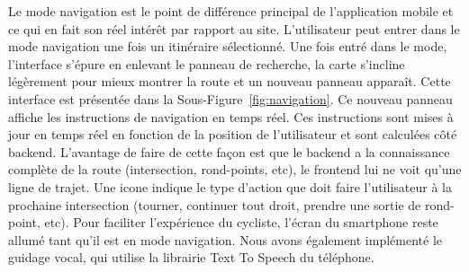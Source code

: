 \noindent Le mode navigation est le point de différence principal de l'application mobile et ce qui en fait son réel intérêt par rapport au site. L'utilisateur peut entrer dans le mode navigation une fois un itinéraire sélectionné. Une fois entré dans le mode, l'interface s'épure en enlevant le panneau de recherche, la carte s'incline légèrement pour mieux montrer la route et un nouveau panneau apparaît. Cette interface est présentée dans la Sous-Figure~\ref{fig:navigation}.
Ce nouveau panneau affiche les instructions de navigation en temps réel. Ces instructions sont mises à jour en temps réel en fonction de la position de l'utilisateur et sont calculées côté backend.
L'avantage de faire de cette façon est que le backend a la connaissance complète de la route (intersection, rond-points, etc), le frontend lui ne voit qu'une ligne de trajet. Une icone indique le type d'action que doit faire l'utilisateur à la prochaine intersection (tourner, continuer tout droit, prendre une sortie de rond-point, etc).
Pour faciliter l'expérience du cycliste, l'écran du smartphone reste allumé tant qu'il est en mode navigation. Nous avons également implémenté le guidage vocal, qui utilise la librairie Text To Speech du téléphone.\\
